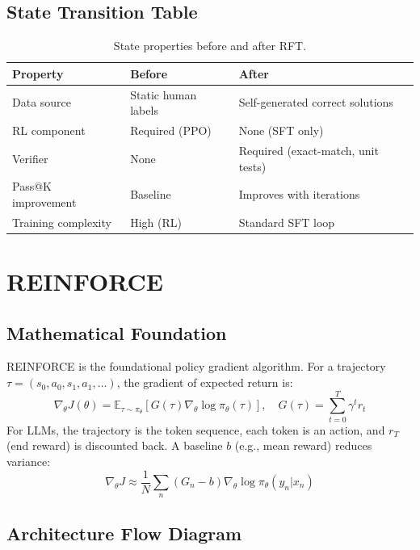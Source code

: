 \subsection{State Transition Table}
\begin{table}[h]\centering
\begin{tabular}{lll}\toprule
\textbf{Property} & \textbf{Before} & \textbf{After}\\\midrule
Data source & Static human labels & Self-generated correct solutions\\
RL component & Required (PPO) & None (SFT only)\\
Verifier & None & Required (exact-match, unit tests)\\
Pass@K improvement & Baseline & Improves with iterations\\
Training complexity & High (RL) & Standard SFT loop\\\bottomrule
\end{tabular}
\caption{State properties before and after RFT.}
\end{table}

\newpage
\section{REINFORCE}

\subsection{Mathematical Foundation}
REINFORCE is the foundational policy gradient algorithm. For a trajectory $\tau = (s_0,a_0,s_1,a_1,\ldots)$, the gradient of expected return is:
\begin{equation}
  \nabla_\theta J(\theta) = \mathbb{E}_{\tau \sim \pi_\theta}\!\left[G(\tau) \nabla_\theta \log \pi_\theta(\tau)\right],\quad G(\tau) = \sum_{t=0}^T \gamma^t r_t
\end{equation}
For LLMs, the trajectory is the token sequence, each token is an action, and $r_T$ (end reward) is discounted back. A baseline $b$ (e.g., mean reward) reduces variance:
\begin{equation}
  \nabla_\theta J \approx \frac{1}{N}\sum_n (G_n - b)\nabla_\theta \log \pi_\theta(y_n|x_n)
\end{equation}

\subsection{Architecture Flow Diagram}

